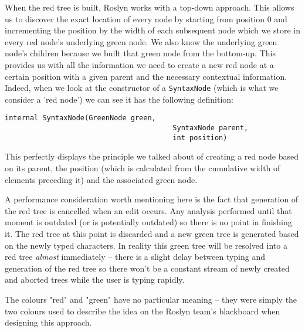 \medskip

When the red tree is built, Roslyn works with a top-down approach. This allows us to discover the exact location of every node by starting from position 0 and incrementing the position by the width of each subsequent node which we store in every red node's underlying green node. We also know the underlying green node's children because we built that green node from the bottom-up. This provides us with all the information we need to create a new red node at a certain position with a given parent and the necessary contextual information. Indeed, when we look at the constructor of a \texttt{SyntaxNode} (which is what we consider a 'red node') we can see it has the following definition:

\begin{lstlisting}
internal SyntaxNode(GreenNode green, 
										SyntaxNode parent, 
										int position)
\end{lstlisting}

This perfectly displays the principle we talked about of creating a red node based on its parent, the position (which is calculated from the cumulative width of elements preceding it) and the associated green node.

\medskip

A performance consideration worth mentioning here is the fact that generation of the red tree is cancelled when an edit occurs. Any analysis performed until that moment is outdated (or is potentially outdated) so there is no point in finishing it. The red tree at this point is discarded and a new green tree is generated based on the newly typed characters. In reality this green tree will be resolved into a red tree \textit{almost} immediately -- there is a slight delay between typing and generation of the red tree so there won't be a constant stream of newly created and aborted trees while the user is typing rapidly.

The colours "red" and "green" have no particular meaning -- they were simply the two colours used to describe the idea on the Roslyn team's blackboard when designing this approach.\parencite{Lippert2012}

